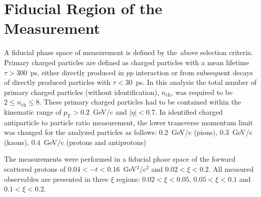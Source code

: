 \section{Fiducial Region of the Measurement}\label{section:star_fiducial}
A fiducial phase space of measurement  is defined by the~above selection criteria. Primary charged particles are defined as charged particles with a mean lifetime $\tau >300$~ps, either directly produced in $pp$ interaction or from subsequent decays of directly produced particles with $\tau <30$~ps. In this analysis the total number of primary charged particles (without identification), $n_\textrm{ch}$, was required to be  $2\leq n_\textrm{ch} \leq 8$. These primary charged particles had to be contained within the kinematic range of $p_\textrm{T}>0.2$~GeV/c and $|\eta|<0.7$. In identified charged antiparticle to particle ratio measurement, the lower transverse momentum limit was changed for the analyzed particles as follows: $0.2$~GeV/c (pions), $0.3$~GeV/c (kaons), $0.4$~GeV/c (protons and antiprotons)

The measurements were performed in a fiducial phase space of the forward scattered protons of $0.04<-t<0.16$~GeV$^{2}$/c$^2$ and $0.02 < \xi<0.2$. All measured observables are presented in three $\xi$ regions: $0.02<\xi<0.05$, $0.05<\xi<0.1$ and $0.1<\xi<0.2$.
\FloatBarrier